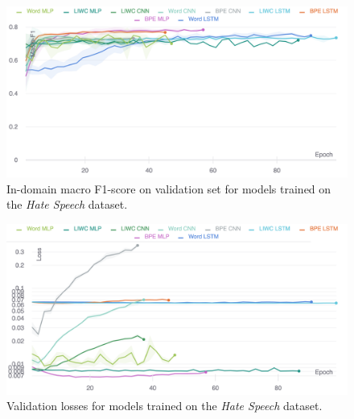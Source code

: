 \begin{figure}
    \centering
    \includegraphics[width=\textwidth]{waseem_hovy_dev_f1.pdf}
    \caption{In-domain macro F1-score on validation set for models trained on the \textit{Hate Speech} dataset.}
    \label{fig:waseem_hovy_dev_f1}
\end{figure}
\begin{figure}
    \centering
    \includegraphics[width=\textwidth]{waseem_hovy_dev_loss_stderr_logscale.pdf}
    \caption{Validation losses for models trained on the \textit{Hate Speech} dataset.}
    \label{fig:waseem_hovy_dev_loss}
\end{figure}

